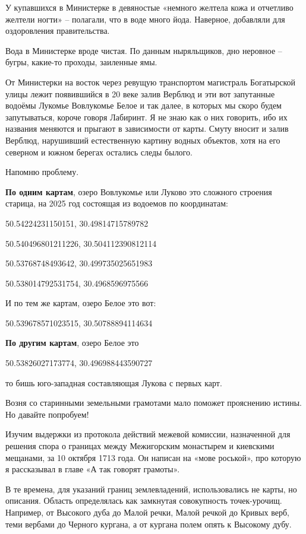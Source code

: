 У купавшихся в Министерке в девяностые «немного желтела кожа и отчетливо желтели ногти» – полагали, что в воде много йода. Наверное, добавляли для оздоровления правительства.

Вода в Министерке вроде чистая. По данным ныряльщиков, дно неровное – бугры, какие-то проходы, заиленные ямы.

От Министерки на восток через ревущую транспортом магистраль Богатырской улицы лежит появившийся в 20 веке залив Верблюд и эти вот запутанные водоёмы Лукомье Вовлукомье Белое и так далее, в которых мы скоро будем запутываться, короче говоря Лабиринт. Я не знаю как о них говорить, ибо их названия меняются и прыгают в зависимости от карты. Смуту вносит и залив Верблюд, нарушивший естественную картину водных объектов, хотя на его северном и южном берегах остались следы былого.

Напомню проблему. 

\textbf{По одним  картам}, озеро Вовлукомье или Луково это сложного строения старица, на 2025 год состоящая из водоемов по координатам:

50.54224231150151, 30.49814715789782

50.540496801211226, 30.504112390812114

50.53768748493642, 30.499735025651983

50.538014792531754, 30.4968596975566\\

\medskip

И по тем же картам, озеро Белое это вот:

50.539678571023515, 30.50788894114634\\

\medskip

\textbf{По другим картам}, озеро Белое это

50.53826027173774, 30.496988443590727\\

\medskip

то бишь юго-западная составляющая Лукова с первых карт.

Возня со старинными земельными грамотами мало поможет прояснению истины. Но давайте попробуем!

Изучим выдержки из протокола действий межевой комиссии, назначенной для решения спора о границах между Межигорским монастырем и киевскими мещанами, за 10 октября 1713 года\cite{sbornikmat}. Он написан на «мове роськой», про которую я рассказывал в главе «А так говорят грамоты».

В те времена, для указаний границ землевладений, использовались не карты, но описания. Область определялась как замкнутая совокупность точек-урочищ. Например, от Высокого дуба до Малой речки, Малой речкой до Кривых верб, теми вербами до Черного кургана, а от кургана полем опять к Высокому дубу.

